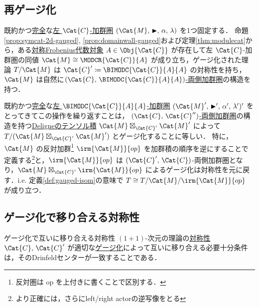 \documentclass[TQFT_main]{subfiles}
\begin{document}
\subsection{再ゲージ化}

既約かつ\hyperref[def:modulecat-exact]{完全}な\hyperref[def:modulecat]{左 $\Cat{C}$-加群圏} $(\Cat{M},\, \btr,\, \alpha,\, \lambda)$ を1つ固定する．
命題\ref{prop:symcat-2d-gauged}, \ref{prop:domainwall-gauged}および定理\ref{thm:modulecat}から，ある\hyperref[def:sym-Frobenius]{対称Frobenius代数対象} $A \in \Obj{\Cat{C}}$ が存在して左 $\Cat{C}$-加群圏の同値 $\Cat{M} \cong \MODCR{\Cat{C}}{A}$ が成り立ち，ゲージ化された理論 $T/\Cat{M}$ は $\Cat{C}' \coloneqq \BIMODC{\Cat{C}}{A}{A}$ の対称性を持ち，$\Cat{M}$ は自然に\hyperref[def:bimodule-cat]{$(\Cat{C},\, \BIMODC{\Cat{C}}{A}{A})$-両側加群圏}の構造を持つ．

既約かつ\hyperref[def:modulecat-exact]{完全}な\hyperref[def:modulecat]{左 $\BIMODC{\Cat{C}}{A}{A}$-加群圏} $(\Cat{M}',\, \btr',\, \alpha',\, \lambda')'$ をとってきてこの操作を繰り返すことは，
\hyperref[def:bimodule-cat]{$(\Cat{C},\, \Cat{C}'')$-両側加群圏}の構造を持つ\hyperref[def:DeligneProduct]{Deligneのテンソル積} $\Cat{M} \boxtimes_{\Cat{C}'} \Cat{M}'$ によって $T/(\Cat{M} \boxtimes_{\Cat{C}'} \Cat{M}')$ とゲージ化することに等しい．
特に，$\Cat{M}$ の反対加群\footnote{反対圏は op を上付きに書くことで区別する．} $\irm{\Cat{M}}{op}$ を加群積の順序を逆にすることで定義する\footnote{より正確には，さらにleft/right actorの逆写像をとる}と，$\irm{\Cat{M}}{op}$ は $(\Cat{C}',\, \Cat{C})$-両側加群圏となり，$\Cat{M} \boxtimes_{\Cat{C}'} \irm{\Cat{M}}{op}$ によるゲージ化は対称性を元に戻す．i.e. 定義\ref{def:gauged-isom}の意味で $T \cong T/\Cat{M}/\irm{\Cat{M}}{op}$ が成り立つ．

\subsection{ゲージ化で移り合える対称性}

\begin{mypropph}[label=prop:symtrans-gauging]{ゲージ化で互いに移り合える対称性}
    $(1+1)$-次元の理論の\hyperref[ax:symcat-2d-0form]{対称性} $\Cat{C},\, \Cat{C}'$ が適切な\hyperref[def:gauging]{ゲージ化}によって互いに移り合える必要十分条件は，そのDrinfeldセンターが一致することである．
\end{mypropph}

\end{document}
